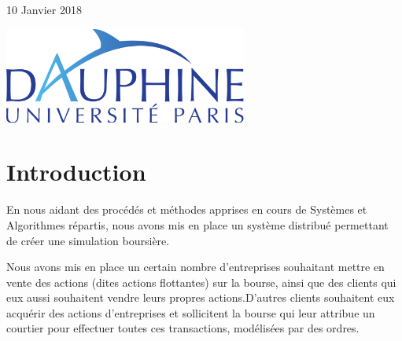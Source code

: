 \documentclass[11pt]{article}
\begin{document}
\begin{titlepage}
	
	
	\vfill\vfill 
	
	{\large10 Janvier 2018} 
	



	\leavevmode \newline 	\leavevmode \newline 	\leavevmode \newline 	\leavevmode \newline 	\leavevmode \newline 
	\includegraphics[width=0.6\textwidth]{dauphine.png}\\[1cm] 
	 

	

	
\end{titlepage}



\doublespacing

\begingroup
  \hypersetup{hidelinks}
  \tableofcontents
\endgroup

\singlespacing
\clearpage


\renewcommand{\thesection}{\Roman{section}}
\renewcommand{\thesubsection}{\thesection.\Roman{subsection}}

\section{  Introduction}


En nous aidant des procédés et méthodes apprises en cours de Systèmes et Algorithmes répartis, nous avons mis en place un système distribué permettant de créer une simulation boursière.\newline 

Nous avons mis en place un certain nombre d’entreprises souhaitant mettre en vente des actions (dites actions flottantes) sur la bourse,  ainsi que des clients qui eux aussi souhaitent vendre leurs propres actions.\newline D’autres clients souhaitent eux acquérir des actions d’entreprises et sollicitent la bourse qui leur attribue un courtier pour effectuer toutes ces transactions, modélisées par des ordres.
\end{document}

